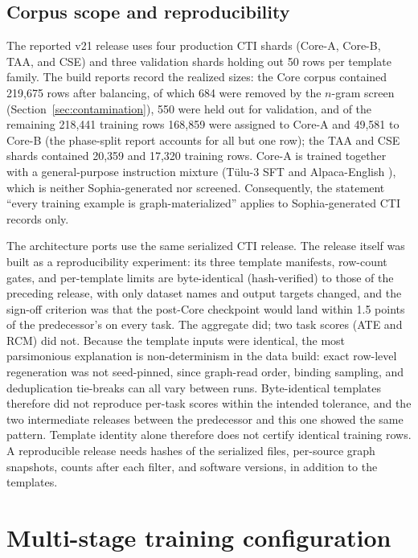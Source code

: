 \documentclass[a4paper,fleqn]{cas-dc}
\begin{document}
\subsection{Corpus scope and reproducibility}\label{sec:corpus}
The reported v21 release uses four production CTI shards (Core-A, Core-B, TAA, and CSE) and three validation shards holding out 50 rows per template family. The build reports record the realized sizes: the Core corpus contained 219,675 rows after balancing, of which 684 were removed by the $n$-gram screen (Section~\ref{sec:contamination}), 550 were held out for validation, and of the remaining 218,441 training rows 168,859 were assigned to Core-A and 49,581 to Core-B (the phase-split report accounts for all but one row); the TAA and CSE shards contained 20,359 and 17,320 training rows. Core-A is trained together with a general-purpose instruction mixture (T\"ulu-3 SFT and Alpaca-English \citep{lambert2024tulu3,taori2023alpaca}), which is neither Sophia-generated nor screened. Consequently, the statement ``every training example is graph-materialized'' applies to Sophia-generated CTI records only.

The architecture ports use the same serialized CTI release. The release itself was built as a reproducibility experiment: its three template manifests, row-count gates, and per-template limits are byte-identical (hash-verified) to those of the preceding release, with only dataset names and output targets changed, and the sign-off criterion was that the post-Core checkpoint would land within 1.5 points of the predecessor's on every task. The aggregate did; two task scores (ATE and RCM) did not. Because the template inputs were identical, the most parsimonious explanation is non-determinism in the data build: exact row-level regeneration was not seed-pinned, since graph-read order, binding sampling, and deduplication tie-breaks can all vary between runs. Byte-identical templates therefore did not reproduce per-task scores within the intended tolerance, and the two intermediate releases between the predecessor and this one showed the same pattern. Template identity alone therefore does not certify identical training rows. A reproducible release needs hashes of the serialized files, per-source graph snapshots, counts after each filter, and software versions, in addition to the templates.

\section{Multi-stage training configuration}\label{sec:training}
\end{document}
